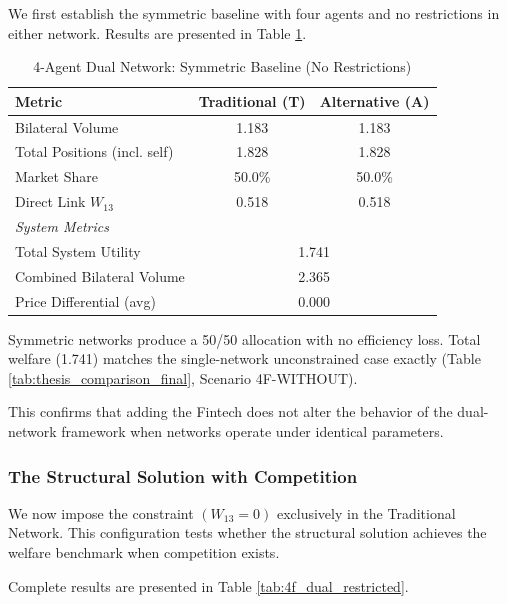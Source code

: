 We first establish the symmetric baseline with four agents and no restrictions in either network. Results are presented in Table \ref{tab:4f_dual_baseline}.

\begin{table}[h]
\centering
\caption{4-Agent Dual Network: Symmetric Baseline (No Restrictions)}
\label{tab:4f_dual_baseline}
\begin{tabular}{lcc}
\hline
\textbf{Metric} & \textbf{Traditional (T)} & \textbf{Alternative (A)} \\ \hline
Bilateral Volume & 1.183 & 1.183 \\
Total Positions (incl. self) & 1.828 & 1.828 \\
Market Share & 50.0\% & 50.0\% \\
Direct Link $W_{13}$ & 0.518 & 0.518 \\
\hline
\multicolumn{3}{l}{\textit{System Metrics}} \\
Total System Utility & \multicolumn{2}{c}{1.741} \\
Combined Bilateral Volume & \multicolumn{2}{c}{2.365} \\
Price Differential (avg) & \multicolumn{2}{c}{0.000} \\
\hline
\end{tabular}
\end{table}

Symmetric networks produce a 50/50 allocation with no efficiency loss. Total welfare (1.741) matches the single-network unconstrained case exactly (Table \ref{tab:thesis_comparison_final}, Scenario 4F-WITHOUT).

This confirms that adding the Fintech does not alter the behavior of the dual-network framework when networks operate under identical parameters.

\subsubsection{The Structural Solution with Competition}

We now impose the constraint $(W_{13}=0)$ exclusively in the Traditional Network. This configuration tests whether the structural solution achieves the welfare benchmark when competition exists.

Complete results are presented in Table \ref{tab:4f_dual_restricted}.

